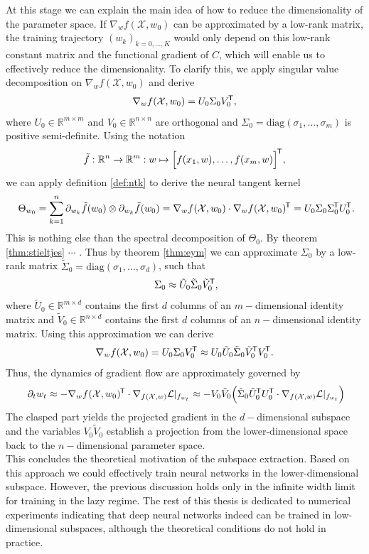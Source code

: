 \documentclass[11pt, a4paper]{article}
\newcommand{\R}{\mathbb{R}}
\newcommand{\X}{\mathcal{X}}
\renewcommand{\L}{\mathcal{L}}
\newcommand*{\tr}{^{\mkern-1.5mu\mathsf{T}}}
\begin{document}
At this stage we can explain the main idea of how to reduce the dimensionality of the parameter space. If $\nabla_wf(\X,w_0)$ can be approximated by a low-rank matrix, the training trajectory $(w_k)_{k=0, \dots, K}$ would only depend on this low-rank constant matrix and the functional gradient of $C$, which will enable us to effectively reduce the dimensionality. To clarify this, we apply singular value decomposition on $\nabla_wf(\X,w_0)$ and derive
\[ \nabla_wf(\X,w_0) = U_0 \Sigma_0 V_0\tr , \]
where $U_0 \in \R^{m \times m}$ and $V_0 \in \R^{n \times n}$ are orthogonal and $\Sigma_0 = \text{diag}(\sigma_1, \dots, \sigma_m)$ is positive semi-definite. Using the notation
\[ \tilde{f}: \R^n \to \R^m : w \mapsto \Big [ f(x_1,w), \dots, f(x_m,w) \Big ]\tr , \]
we can apply definition \ref{def:ntk} to derive the neural tangent kernel
\[ \Theta_{w_0} = \sum_{k=1}^{n} \partial_{w_k} \tilde{f}(w_0) \otimes \partial_{w_k} \tilde{f}(w_0) = \nabla_wf(\X,w_0) \cdot \nabla_wf(\X,w_0)\tr  = U_0 \Sigma_0 \Sigma_0\tr  U_0\tr . \]
This is nothing else than the spectral decomposition of $\Theta_0$. By theorem \ref{thm:stieltjes} $\cdots$ . Thus by theorem \ref{thm:eym} we can approximate $\Sigma_0$ by a low-rank matrix $\tilde{\Sigma}_0 = \text{diag}(\sigma_1, \dots, \sigma_d)$, such that
\[ \Sigma_0 \approx \tilde{U}_0 \tilde{\Sigma}_0 \tilde{V}_0\tr , \]
where $\tilde{U}_0 \in \R^{m \times d}$ contains the first $d$ columns of an $m-$dimensional identity matrix and $\tilde{V}_0 \in \R^{n \times d}$ contains the first $d$ columns of an $n-$dimensional identity matrix. Using this approximation we can derive
\[ \nabla_wf(\X,w_0) = U_0 \Sigma_0 V_0\tr  \approx U_0 \tilde{U}_0 \tilde{\Sigma}_0 \tilde{V}_0\tr  V_0\tr . \]
Thus, the dynamics of gradient flow are approximately governed by
\[ \partial_t w_t \approx -\nabla_wf(\X,w_0)\tr  \cdot \nabla_{f(\X,w)} \L|_{f_{w_t}} \approx - V_0 \tilde{V}_0 \Big ( \tilde{\Sigma}_0 \tilde{U}_0\tr  U_0\tr  \cdot \nabla_{f(\X,w)} \L|_{f_{w_t}} \Big ) \]
The clasped part yields the projected gradient in the $d-$dimensional subspace and the variables $V_0 \tilde{V}_0$ establish a projection from the lower-dimensional space back to the $n-$dimensional parameter space. \\

This concludes the theoretical motivation of the subspace extraction. Based on this approach we could effectively train neural networks in the lower-dimensional subspace. However, the previous discussion holds only in the infinite width limit for training in the lazy regime. The rest of this thesis is dedicated to numerical experiments indicating that deep neural networks indeed can be trained in low-dimensional subspaces, although the theoretical conditions do not hold in practice. \\
\end{document}

